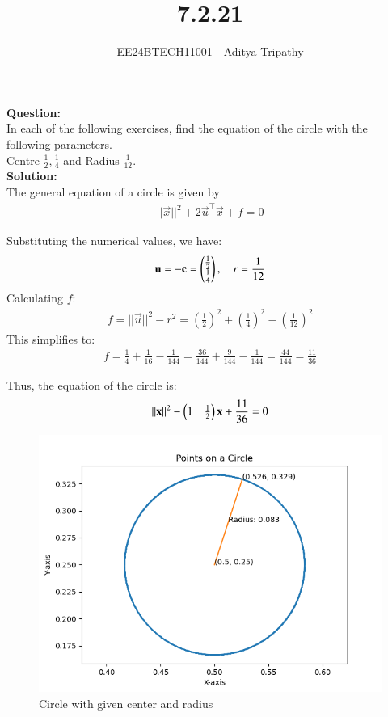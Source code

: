 \documentclass[journal]{IEEEtran}
\begin{document}

\vspace{3cm}

\title{7.2.21}
\author{EE24BTECH11001 - Aditya Tripathy
}
{\let\newpage\relax\maketitle}

\renewcommand{\thefigure}{\theenumi}
\renewcommand{\thetable}{\theenumi}
\setlength{\intextsep}{10pt} %

\textbf{Question:}\\
In each of the following exercises,  find the equation of the circle with the following parameters.\\
Centre $\frac{1}{2},  \frac{1}{4}$ and Radius $\frac{1}{12}$.
\\
\textbf{Solution:}\\
The general equation of a circle is given by 
\begin{align}
    ||\vec{x}||^2 + 2 \vec{u}^{\top}\vec{x} + f = 0
\end{align}

Substituting the numerical values, we have:
\begin{align}
    \mathbf{u} = -\mathbf{c} = \begin{pmatrix}\frac{1}{2} \\ \frac{1}{4}\end{pmatrix}, \quad r = \frac{1}{12}
\end{align}
Calculating \(f\):
\begin{align}
    f = ||\vec{u}||^2 - r^2 = \left(\frac{1}{2}\right)^2 + \left(\frac{1}{4}\right)^2 - \left(\frac{1}{12}\right)^2 
\end{align}
This simplifies to:
\begin{align}
    f = \frac{1}{4} + \frac{1}{16} - \frac{1}{144} = \frac{36}{144} + \frac{9}{144} - \frac{1}{144} = \frac{44}{144} = \frac{11}{36}
\end{align}

Thus, the equation of the circle is:
\begin{align}
    ||\mathbf{x}||^2 - \begin{pmatrix}1 & \frac{1}{2}\end{pmatrix} \mathbf{x} + \frac{11}{36} = 0
\end{align}

\begin{figure}[h!]
   \centering
   \includegraphics[width=0.7\linewidth]{figs/fig.png}
   \caption{Circle with given center and radius}
\end{figure}
\end{document}

